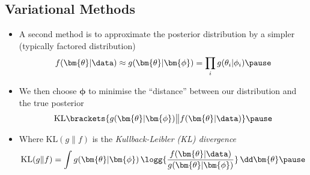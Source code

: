 \begin{slide}
\section[-2]{Variational Methods}

\begin{PauseHighLight}
  \begin{itemize}
  \item A second method is to approximate the posterior distribution by
    a simpler (typically factored distribution)
    \begin{align*}
      f(\bm{\theta}|\data) \approx g(\bm{\theta}|\bm{\phi}) = \prod_i
      g(\theta_i|\phi_i)\pause
    \end{align*}
  \item We then choose $\bm{\phi}$ to minimise the ``distance'' between
    our distribution and the true posterior
    \begin{align*}
      \mathrm{KL}\brackets{ g(\bm{\theta}|\bm{\phi}) \big\|
      f(\bm{\theta}|\data) }\pause
    \end{align*}
  \item Where $\mathrm{KL}(g \| f)$ is the \textit{Kullback-Leibler (KL)
      divergence}
    \begin{align*}
      \mathrm{KL}(g \| f) = \int g(\bm{\theta}|\bm{\phi}) \, 
      \logg{ \frac{f(\bm{\theta}|\data)}{g(\bm{\theta}|\bm{\phi})} } \,
      \dd \bm{\theta}\pause
    \end{align*}
  \end{itemize}
\end{PauseHighLight}

\end{slide}


